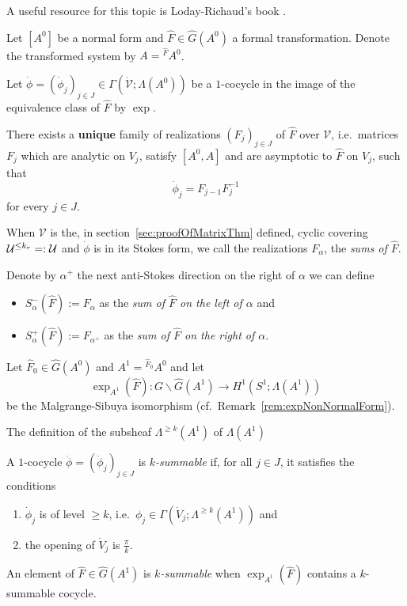 A useful resource for this topic is Loday-Richaud's book \cite{Loday2014}.

Let $[A^0]$ be a normal form and $\hat F\in\hat G(A^0)$ a formal
transformation. Denote the transformed system by $A={}^{\hat F}\!A^0$.

Let $\dot\phi=(\dot\phi_j)_{j\in J}\in\Gamma(\dot{\mathcal{V}};\Lambda(A^0))$
be a $1$-cocycle in the image of the equivalence class of $\hat F$ by $\exp$.
\begin{prop}\label{prop:multisummability}
  There exists a \textbf{unique} family of realizations $(F_j)_{j\in J}$ of
  $\hat F$ over $\mathcal{V}$, i.e.\ matrices $F_j$ which are analytic on
  $V_j$, satisfy $[A^0,A]$ and are asymptotic to $\hat F$ on $V_j$, such that
  \[
    \dot\phi_j=F_{j-1}F_j^{-1}
  \]
  for every $j\in J$.
\end{prop}
When $\mathcal{V}$ is the, in section~\ref{sec:proofOfMatrixThm} defined,
cyclic covering $\mathcal{U}^{\leq k_r}=:\mathcal{U}$ and $\dot\phi$ is in its Stokes 
form\TODO[~(cf.~??)], we call the realizations $F_{\alpha}$, the
\emph{sums of $\hat F$}.
\begin{defn}\label{defn:sumsLeftRight}
  Denote by $\alpha^+$ the next anti-Stokes direction on the right of $\alpha$
  we can define
  \begin{itemize}
    \item $S_\alpha^-(\hat F):=F_\alpha$ as the \emph{sum of $\hat F$ on the
      left of $\alpha$} and
    \item $S_\alpha^+(\hat F):=F_{\alpha^+}$ as the \emph{sum of $\hat F$ on
      the right of $\alpha$}.
  \end{itemize}
\end{defn}

Let $\hat F_0\in\hat G(A^0)$ and $A^1={}^{\hat F_0}\!A^0$ and let
\[
  \exp_{A^1}(\hat F):G\backslash\hat G(A^1) \to H^1(S^1;\Lambda(A^1))
\]
be the Malgrange-Sibuya isomorphism (cf.\ Remark~\ref{rem:expNonNormalForm}).

The definition of the subsheaf $\Lambda^{\geq k}(A^1)$ of $\Lambda(A^1)$
 \TODO{}

\begin{defn}
  A $1$-cocycle $\dot\phi=(\dot\phi_j)_{j\in J}$ is \emph{$k$-summable} if, for
  all $j\in J$, it satisfies the conditions
  \begin{enumerate}
    \item $\dot\phi_j$ is of level $\geq k$,
      i.e.\ $\phi_j\in\Gamma(\dot V_j;\Lambda^{\geq k}(A^1))$ and
    \item the opening of $\dot V_j$ is $\frac{\pi}{k}$.
  \end{enumerate}
  An element of $\hat F\in\hat G(A^1)$ is \emph{$k$-summable} when
  $\exp_{A^1}(\hat F)$ contains a $k$-summable cocycle.
\end{defn}

